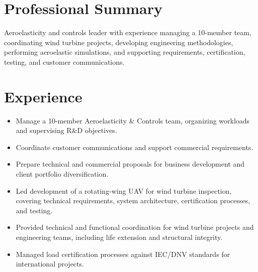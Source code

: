 

\small
\section{Professional Summary}
Aeroelasticity and controls leader with experience managing a 10-member team, coordinating wind turbine projects, developing engineering methodologies, performing aeroelastic simulations, and supporting requirements, certification, testing, and customer communications.
\section{Experience}

\begin{itemize}

\item Manage a 10-member Aeroelasticity \& Controls team, organizing workloads and supervising R\&D objectives.

\item Coordinate customer communications and support commercial requirements.

\item Prepare technical and commercial proposals for business development and client portfolio diversification.

\end{itemize}

\begin{itemize}

\item Led development of a rotating-wing UAV for wind turbine inspection, covering technical requirements, system architecture, certification processes, and testing.

\item Provided technical and functional coordination for wind turbine projects and engineering teams, including life extension and structural integrity.

\item Managed load certification processes against IEC/DNV standards for international projects.

\end{itemize}

